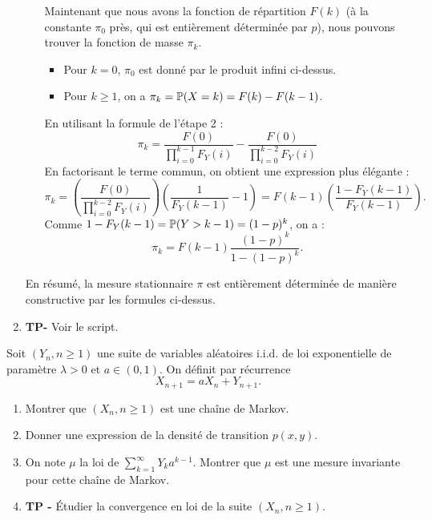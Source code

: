 \documentclass[solutions]{exercices}
\begin{document}
\begin{solution}
\begin{enumerate}
\begin{enumerate}
			            Maintenant que nous avons la fonction de répartition $F(k)$ (à la constante $\pi_0$ près, qui est entièrement déterminée par $p$), nous pouvons trouver la fonction de masse $\pi_k$.
			            \begin{itemize}
				            \item Pour $k=0$, $\pi_0$ est donné par le produit infini ci-dessus.
				            \item Pour $k \ge 1$, on a $\pi_k = \P(X=k) = F(k) - F(k-1)$.
			            \end{itemize}
			            En utilisant la formule de l'étape 2 :
			            \[
				            \pi_k = \frac{F(0)}{\prod_{i=0}^{k-1} F_Y(i)} - \frac{F(0)}{\prod_{i=0}^{k-2} F_Y(i)}
			            \]
			            En factorisant le terme commun, on obtient une expression plus élégante :
			            \[
				            \pi_k = \left(\frac{F(0)}{\prod_{i=0}^{k-2} F_Y(i)}\right) \left( \frac{1}{F_Y(k-1)} - 1 \right) = F(k-1) \left( \frac{1 - F_Y(k-1)}{F_Y(k-1)} \right).
			            \]
			            Comme $1 - F_Y(k-1) = \P(Y > k-1) = (1-p)^k$, on a :
			            \[ \pi_k = F(k-1) \frac{(1-p)^k}{1 - (1-p)^k}. \]

		      \end{enumerate}
		      En résumé, la mesure stationnaire $\pi$ est entièrement déterminée de manière constructive par les formules ci-dessus.
		\item \textbf{TP-} Voir le script.
	\end{enumerate}
\end{solution}

\begin{exercice}[Perpetuité]
	Soit $(Y_n, n \geq 1)$ une suite de variables aléatoires i.i.d. de loi exponentielle de paramètre $\lambda > 0$ et $a \in (0,1)$. On définit par récurrence
	\[
		X_{n+1} = a X_n + Y_{n+1}.
	\]
	\begin{enumerate}
		\item Montrer que $(X_n, n \geq 1)$ est une chaîne de Markov.
		\item Donner une expression de la densité de transition $p(x,y)$.
		\item On note $\mu$ la loi de $\sum_{k = 1}^\infty Y_k a^{k-1}$. Montrer que $\mu$ est une mesure invariante pour cette chaîne de Markov.
		\item \textbf{TP - } Étudier la convergence en loi de la suite $(X_n, n \geq 1)$.
	\end{enumerate}
\end{exercice}
\end{document}
